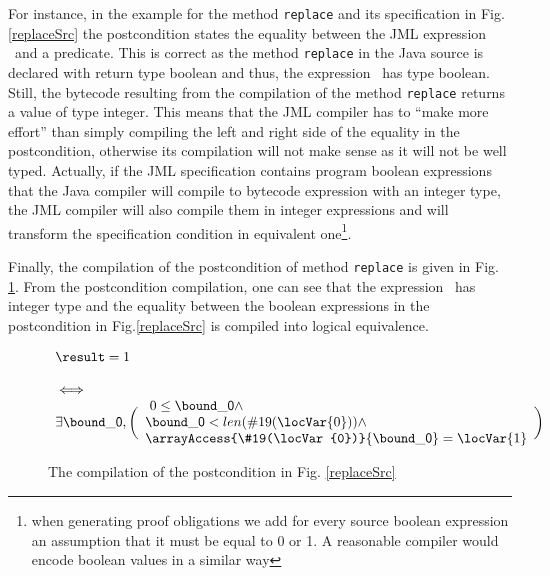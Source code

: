 \begin{enumerate}
 For instance, in the example for the method 
\texttt{replace} and its specification in Fig.\ref{replaceSrc} the postcondition states the equality between the JML expression  
\result \ and a predicate. This is correct as the method \texttt{replace} in the Java source is declared with return type boolean  and thus,
 the expression \result \ has type boolean. 
Still, the bytecode resulting from the compilation of the method  \texttt{replace} returns a value of type integer. This means that the JML compiler has to 
``make more effort'' than simply compiling the left and right side of the equality in the postcondition, otherwise its compilation will not make sense as 
it will not be well typed. Actually, if the JML specification contains program boolean expressions that the Java compiler will compile to bytecode expression
 with an integer type, the JML compiler will also compile them in integer expressions and will transform the specification condition in equivalent 
one\footnote{when generating proof obligations we add for every source boolean expression an assumption that it
 must be equal to 0 or 1. A reasonable compiler would encode boolean values in a similar way}.  

Finally, the compilation of the postcondition of method \texttt{replace} is given in Fig. \ref{postCompile}. From the postcondition compilation,
 one can see that the expression \result \ has integer type and the equality between the boolean expressions in the postcondition in Fig.\ref{replaceSrc} is
 compiled into logical equivalence. 

\begin{figure}[t]
 $$\begin{array}{l}
         \result = 1 \\
          \\ 
         \iff \\ 
         \exists    \bound\_{\mbox{\rm \textsf{0}}}, 
           \biggl(\begin{array}{l} \ 0 \leq  \bound\_{\mbox{\rm \textsf{0}}} \wedge\\ 
             \bound\_{\mbox{\rm \textsf{0}}} < len(\#19(\locVar{0})) \wedge \\
             \arrayAccess{\#19(\locVar{0})}{\bound\_{\mbox{\rm \textsf{0}}} } = \locVar{1} 
         \end{array} \biggr) 
   \end{array}
$$
\caption{\sc The compilation of the postcondition in Fig. \ref{replaceSrc}}
\label{postCompile}
\end{figure}






\end{enumerate}

